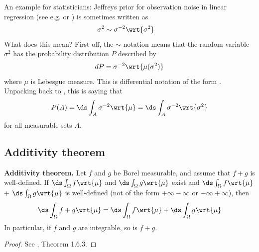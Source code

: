 \documentclass{article} %
\newcommand{\dint}{\ds\int}
\newcommand{\dmu}{\wrt{\mu}}
\begin{document}
\begin{example-for-data-scientists}{}
An example for statisticians: Jeffreys prior for observation noise in linear regression  (see e.g. \cite{carvalho2010horseshoe} or \cite{makalic2015simple}) is sometimes written as
\begin{align}
 \sigma^2 &\sim \sigma^{-2} \wrt{\sigma^2} \label{eqn:prior_on_observation_noise_for_linear_regression_model_with_horseshoe_prior_jeffreys_special_case}
\end{align}
%
What does this mean?  First off, the $\sim$ notation means that the random variable $\sigma^2$ has the probability distribution $P$ described by
\[  dP = \sigma^{-2} \wrt{\mu(\sigma^2)} \]
where $\mu$ is Lebesgue measure. This is differential notation of the form .  Unpacking back to 	, this is saying that
\[  P(A) = \ds\int_A \sigma^{-2} \dmu  = \ds\int_A \sigma^{-2} \wrt{\sigma^2} \]
for all measurable sets $A$.
\end{example-for-data-scientists}

\subsection{Additivity theorem}
 
\begin{theorem}{\textbf{Additivity theorem.}}
Let $f$ and $g$ be Borel measurable, and assume that $f+g$ is well-defined.  If $\dint_\Omega f \dmu$ and $\dint_\Omega g \dmu$ exist and $\dint_\Omega f \dmu$ + $\dint_\Omega g \dmu$ is well-defined (not of the form $+ \infty - \infty$ or $- \infty +\infty$), then 
\[ \dint_\Omega f +g \dmu = \dint_\Omega f \dmu + \dint_\Omega g \dmu \]
In particular, if $f$ and $g$ are integrable, so is $f+g$.
\label{thm:additivity}
\end{theorem}

\begin{proof}
See \cite{ash2000probability}, Theorem 1.6.3.	
\end{proof}
\end{document}
